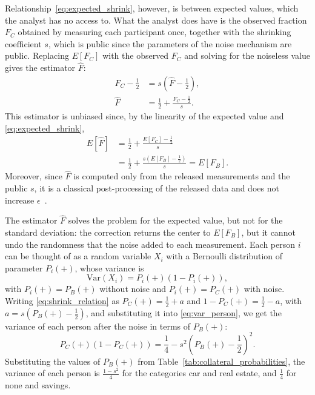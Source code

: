 \documentclass{ieeeaccess}
\begin{document}
Relationship~\eqref{eq:expected_shrink}, however, is between expected values, which the analyst has no access to. What the analyst does have is the observed fraction $F_C$ obtained by measuring each participant once, together with the shrinking coefficient $s$, which is public since the parameters of the noise mechanism are public. Replacing $E[F_C]$ with the observed $F_C$ and solving for the noiseless value gives the estimator $\hat{F}$:
\begin{align}
  F_C - \tfrac{1}{2} &= s\left(\hat{F} - \tfrac{1}{2}\right), \nonumber \\
  \hat{F} &= \frac{1}{2} + \frac{F_C - \frac{1}{2}}{s}.
  \label{eq:estimator}
\end{align}
This estimator is unbiased since, by the linearity of the expected value and \eqref{eq:expected_shrink},
\begin{align}
  E[\hat{F}] &= \frac{1}{2} + \frac{E[F_C] - \frac{1}{2}}{s} \nonumber \\
             &= \frac{1}{2} + \frac{s\left(E[F_B] - \frac{1}{2}\right)}{s} = E[F_B].
  \label{eq:unbiased}
\end{align}
Moreover, since $\hat{F}$ is computed only from the released measurements and the public $s$, it is a classical post-processing of the released data and does not increase $\epsilon$~\cite[Prop.~2.1]{dwork2014algorithmic}.

The estimator $\hat{F}$ solves the problem for the expected value, but not for the standard deviation: the correction returns the center to $E[F_B]$, but it cannot undo the randomness that the noise added to each measurement. Each person $i$ can be thought of as a random variable $X_i$ with a Bernoulli distribution of parameter $P_i(+)$, whose variance is
\begin{equation}
  \mathrm{Var}(X_i) = P_i(+)\left(1 - P_i(+)\right),
  \label{eq:var_person}
\end{equation}
with $P_i(+) = P_B(+)$ without noise and $P_i(+) = P_C(+)$ with noise. Writing \eqref{eq:shrink_relation} as $P_C(+) = \frac{1}{2} + a$ and $1 - P_C(+) = \frac{1}{2} - a$, with $a = s\left(P_B(+) - \frac{1}{2}\right)$, and substituting it into \eqref{eq:var_person}, we get the variance of each person after the noise in terms of $P_B(+)$:
\begin{equation}
  P_C(+)\left(1 - P_C(+)\right) = \frac{1}{4} - s^2\left(P_B(+) - \frac{1}{2}\right)^2.
  \label{eq:var_person_c}
\end{equation}
Substituting the values of $P_B(+)$ from Table~\ref{tab:collateral_probabilities}, the variance of each person is $\frac{1-s^2}{4}$ for the categories car and real estate, and $\frac{1}{4}$ for none and savings.
\end{document}
